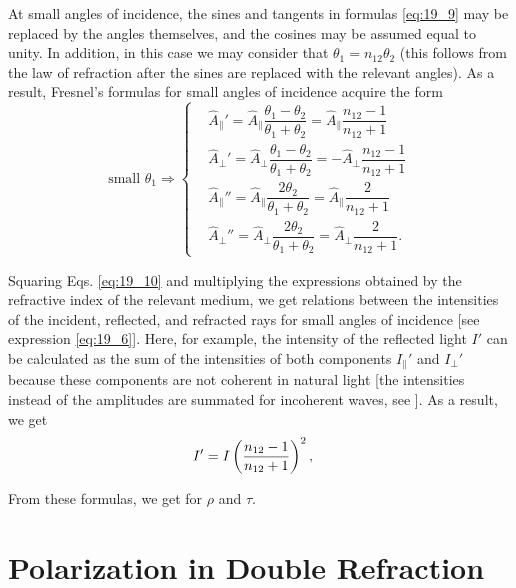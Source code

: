 At small angles of incidence, the sines and tangents in formulas \eqref{eq:19_9} may be replaced by the angles themselves, and the cosines
may be assumed equal to unity.
In addition, in this case we may consider that $\theta_1=n_{12}\theta_2$ (this follows from the law of refraction after the sines are replaced with the relevant angles).
As a result, Fresnel's formulas for small angles of incidence acquire the form
\begin{equation}\label{eq:19_10}
	\text{small }\theta_1 \Rightarrow \begin{cases}
		&\!\!\! \hat{A}_{\parallel}' = \hat{A}_{\parallel} \dfrac{\theta_1-\theta_2}{\theta_1+\theta_2} = \hat{A}_{\parallel} \dfrac{n_{12}-1}{n_{12}+1}\\[8pt]
		&\!\!\! \hat{A}_{\perp}' = \hat{A}_{\perp} \dfrac{\theta_1-\theta_2}{\theta_1+\theta_2} = - \hat{A}_{\perp} \dfrac{n_{12}-1}{n_{12}+1}\\[8pt]
		&\!\!\! \hat{A}_{\parallel}'' = \hat{A}_{\parallel} \dfrac{2\theta_2}{\theta_1+\theta_2} = \hat{A}_{\parallel} \dfrac{2}{n_{12}+1}\\[8pt]
		&\!\!\! \hat{A}_{\perp}'' = \hat{A}_{\perp} \dfrac{2\theta_2}{\theta_1+\theta_2} = \hat{A}_{\perp} \dfrac{2}{n_{12}+1}.
	\end{cases}
\end{equation}

Squaring Eqs. \eqref{eq:19_10} and multiplying the expressions obtained by the refractive index of the relevant medium, we get relations between the intensities of the incident, reflected, and refracted rays for small angles of incidence [see expression \eqref{eq:19_6}].
Here, for example, the intensity of the reflected light $I'$ can be calculated as the sum of the intensities of both components $I_{\parallel}'$ and $I_{\perp}'$ because these components are not coherent in natural light [the intensities instead of the amplitudes are summated for incoherent waves, see ].
As a result, we get
\begin{equation*}
	I' = I \left(\frac{n_{12}-1}{n_{12}+1}\right)^2, \quad
\end{equation*}

\noindent
From these formulas, we get  for $\rho$ and $\tau$.

\section{Polarization in Double Refraction}\label{sec:19_3}

